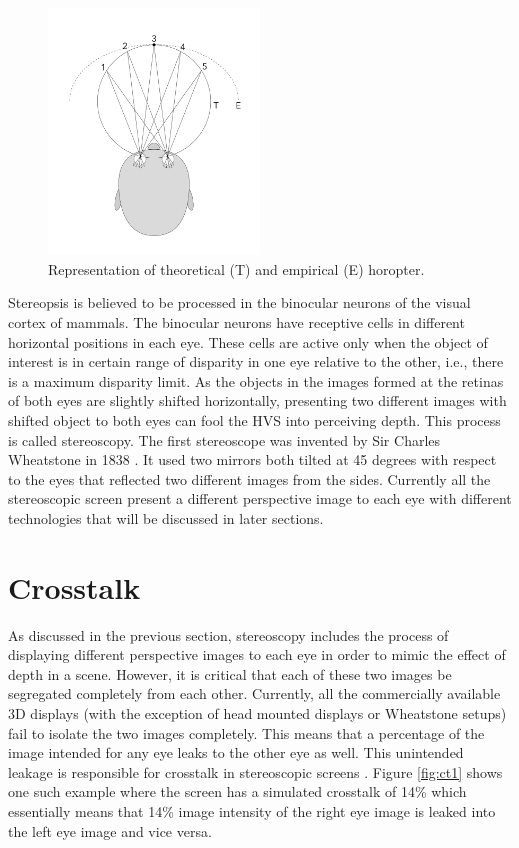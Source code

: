 \begin{figure}
\centering
    \includegraphics[width=0.5\textwidth]{./Template_Figures/horopter}
    \caption{Representation of theoretical (T) and empirical (E) horopter.\label{fig:horoptor}}
\end{figure}

Stereopsis is believed to be processed in the binocular neurons of the visual cortex of mammals. The binocular neurons have receptive cells in different horizontal positions in each eye. These cells are active only when the object of interest is in certain range of disparity in one eye relative to the other, i.e., there is a maximum disparity limit. As the objects in the images formed at the retinas of both eyes are slightly shifted horizontally, presenting two different images with shifted object to both eyes can fool the HVS into perceiving depth. This process is called stereoscopy. The first stereoscope was invented by Sir Charles Wheatstone in 1838 \cite{ wiki:wheatstone}. It used two mirrors both tilted at 45 degrees with respect to the eyes that reflected two different images from the sides. Currently all the stereoscopic screen present a different perspective image to each eye with different technologies that will be discussed in later sections.

\section{Crosstalk}
As discussed in the previous section, stereoscopy includes the process of displaying different perspective images to each eye in order to mimic the effect of depth in a scene. However, it is critical that each of these two images be segregated completely from each other. Currently, all the commercially available 3D displays (with the exception of head mounted displays or Wheatstone setups) fail to isolate the two images completely. This means that a percentage of the image intended for any eye leaks to the other eye as well. This unintended leakage is responsible for crosstalk in stereoscopic screens \cite{woods2012crosstalk}. Figure \ref{fig:ct1} shows one such example where the screen has a simulated crosstalk of 14\% which essentially means that 14\% image intensity of the right eye image is leaked into the left eye image and vice versa.

